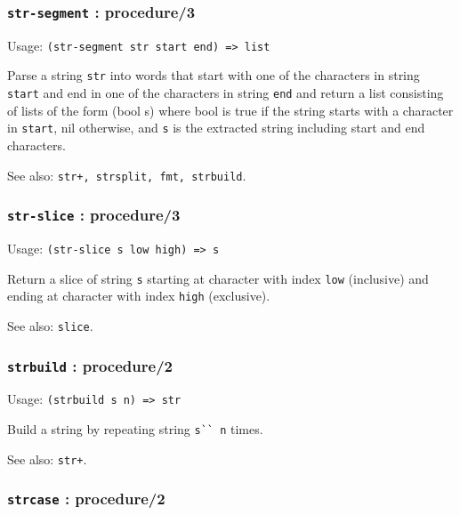 \documentclass[
]{article}
\newcommand{\passthrough}[1]{#1}
\begin{document}
\hypertarget{str-segment-procedure3}{%
\subsubsection{\texorpdfstring{\texttt{str-segment} :
procedure/3}{str-segment : procedure/3}}\label{str-segment-procedure3}}

Usage: \passthrough{\lstinline!(str-segment str start end) => list!}

Parse a string \passthrough{\lstinline!str!} into words that start with
one of the characters in string \passthrough{\lstinline!start!} and end
in one of the characters in string \passthrough{\lstinline!end!} and
return a list consisting of lists of the form (bool s) where bool is
true if the string starts with a character in
\passthrough{\lstinline!start!}, nil otherwise, and
\passthrough{\lstinline!s!} is the extracted string including start and
end characters.

See also: \passthrough{\lstinline!str+, strsplit, fmt, strbuild!}.

\hypertarget{str-slice-procedure3}{%
\subsubsection{\texorpdfstring{\texttt{str-slice} :
procedure/3}{str-slice : procedure/3}}\label{str-slice-procedure3}}

Usage: \passthrough{\lstinline!(str-slice s low high) => s!}

Return a slice of string \passthrough{\lstinline!s!} starting at
character with index \passthrough{\lstinline!low!} (inclusive) and
ending at character with index \passthrough{\lstinline!high!}
(exclusive).

See also: \passthrough{\lstinline!slice!}.

\hypertarget{strbuild-procedure2}{%
\subsubsection{\texorpdfstring{\texttt{strbuild} :
procedure/2}{strbuild : procedure/2}}\label{strbuild-procedure2}}

Usage: \passthrough{\lstinline!(strbuild s n) => str!}

Build a string by repeating string \passthrough{\lstinline!s`` n!}
times.

See also: \passthrough{\lstinline!str+!}.

\hypertarget{strcase-procedure2}{%
\subsubsection{\texorpdfstring{\texttt{strcase} :
procedure/2}{strcase : procedure/2}}\label{strcase-procedure2}}
\end{document}
